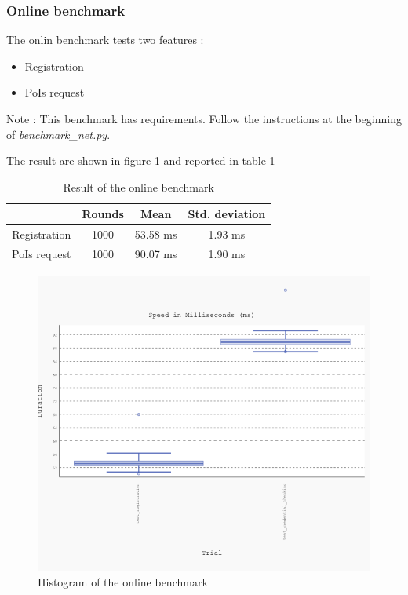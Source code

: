 \documentclass[10pt,conference,compsocconf]{IEEEtran}
\begin{document}
\subsubsection{Online benchmark}
The onlin benchmark tests two features :
\begin{itemize}
    \item Registration
    \item PoIs request
\end{itemize}
Note : This benchmark has requirements. Follow the instructions at the beginning of \textit{benchmark\_net.py}.

The result are shown in figure \ref{benchonline_fig}
and reported in table \ref{benchonline}
\begin{table}
\begin{tabular}{|c|c|c|c|}
    \hline
                    & Rounds    & Mean      & Std. deviation    \\
    \hline
    Registration    & 1000      & 53.58 ms  & 1.93 ms           \\
    \hline
    PoIs request    & 1000      & 90.07 ms  & 1.90 ms           \\
    \hline   
\end{tabular}
\caption{Result of the online benchmark}
\label{benchonline}
\end{table}
\begin{figure}
    \includegraphics[width=\columnwidth]{benchmark_net.png}
    \caption{Histogram of the online benchmark}
    \label{benchonline_fig}
\end{figure}
\end{document}
